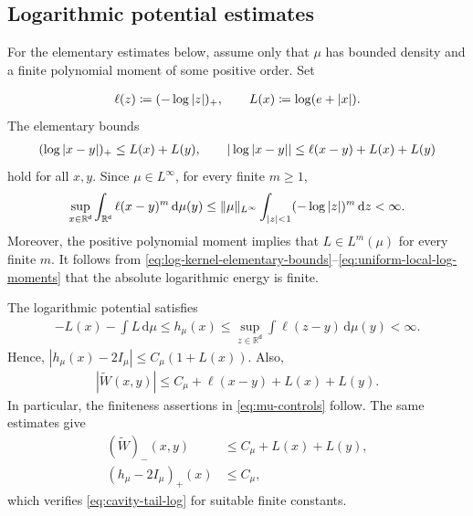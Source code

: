 \documentclass[11pt,reqno]{amsart}
\numberwithin{equation}{section}
\theoremstyle{plain}
\theoremstyle{remark}
\DeclarePairedDelimiter{\pa}{\lparen}{\rparen}
\DeclarePairedDelimiter{\norm}{\lVert}{\rVert}
\renewcommand{\d}{\mathsf{d}}
\newcommand{\md}{\mathrm{d}}
\newcommand{\R}{{\mathbb{R}}}
\newcommand{\tl}{\widetilde}
\begin{document}
\subsection{Logarithmic potential estimates}
\label{subsubsec:log-order-verification}

For the elementary estimates below, assume only that $\mu$ has bounded density and a finite polynomial moment of some positive order.  Set

\begin{align}\label{eq:log-local-singularity-weight}
 \ell(z)\coloneqq\pa{-\log|z|}_+,
 \qquad
 L(x)\coloneqq\log(e+|x|).
\end{align}
The elementary bounds
\begin{align}\label{eq:log-kernel-elementary-bounds}
 \pa{\log|x-y|}_+\le L(x)+L(y),
 \qquad
 |\log|x-y||\le \ell(x-y)+L(x)+L(y)
\end{align}
hold for all \(x,y\).  Since \(\mu\in L^\infty\), for every finite \(m\ge1\),
\begin{align}\label{eq:uniform-local-log-moments}
 \sup_{x\in\R^\d}\int_{\R^\d}\ell(x-y)^m\,\md\mu(y)
 \le \norm{\mu}_{L^\infty}
 \int_{|z|<1}\pa{-\log|z|}^m\,\md z<\infty.
\end{align}
Moreover, the positive polynomial moment implies that \(L\in L^m(\mu)\) for every finite \(m\).  It follows from \eqref{eq:log-kernel-elementary-bounds}--\eqref{eq:uniform-local-log-moments} that the absolute logarithmic energy is finite.

The logarithmic potential satisfies
\begin{align}\label{eq:log-potential-growth}
 -L(x)-\int L\,\md\mu
 \le h_\mu(x)
 \le \sup_{z\in\R^\d}\int \ell(z-y)\,\md\mu(y)<\infty.
\end{align}
Hence, \(|h_\mu(x)-2I_\mu|\le C_\mu(1+L(x))\).  Also,
\begin{align}\label{eq:centered-log-growth}
 |\tl W(x,y)|
 \le C_\mu+\ell(x-y)+L(x)+L(y).
\end{align}
In particular, the finiteness assertions in \eqref{eq:mu-controls} follow.  The same estimates give
\begin{align}
 (\tl W)_-(x,y)&\le C_\mu+L(x)+L(y),\label{eq:centered-log-negative-part}\\
 (h_\mu-2I_\mu)_+(x)&\le C_\mu,\label{eq:log-potential-positive-part}
\end{align}
which verifies \eqref{eq:cavity-tail-log} for suitable finite constants.
\end{document}
